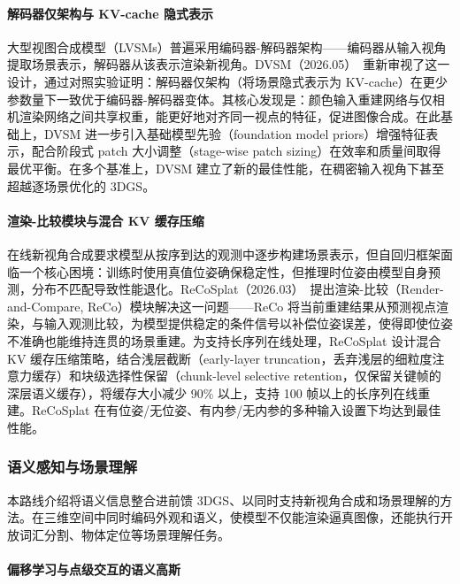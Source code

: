 \paragraph{解码器仅架构与 KV-cache 隐式表示}

大型视图合成模型（LVSMs）普遍采用编码器-解码器架构——编码器从输入视角提取场景表示，解码器从该表示渲染新视角。DVSM（2026.05）~\cite{2605_29891}重新审视了这一设计，通过对照实验证明：解码器仅架构（将场景隐式表示为 KV-cache）在更少参数量下一致优于编码器-解码器变体。其核心发现是：颜色输入重建网络与仅相机渲染网络之间共享权重，能更好地对齐同一视点的特征，促进图像合成。在此基础上，DVSM 进一步引入基础模型先验（foundation model priors）增强特征表示，配合阶段式 patch 大小调整（stage-wise patch sizing）在效率和质量间取得最优平衡。在多个基准上，DVSM 建立了新的最佳性能，在稠密输入视角下甚至超越逐场景优化的 3DGS。

\paragraph{渲染-比较模块与混合 KV 缓存压缩}

在线新视角合成要求模型从按序到达的观测中逐步构建场景表示，但自回归框架面临一个核心困境：训练时使用真值位姿确保稳定性，但推理时位姿由模型自身预测，分布不匹配导致性能退化。ReCoSplat（2026.03）~\cite{2603_09968}提出渲染-比较（Render-and-Compare, ReCo）模块解决这一问题——ReCo 将当前重建结果从预测视点渲染，与输入观测比较，为模型提供稳定的条件信号以补偿位姿误差，使得即使位姿不准确也能维持连贯的场景重建。为支持长序列在线处理，ReCoSplat 设计混合 KV 缓存压缩策略，结合浅层截断（early-layer truncation，丢弃浅层的细粒度注意力缓存）和块级选择性保留（chunk-level selective retention，仅保留关键帧的深层语义缓存），将缓存大小减少 90\% 以上，支持 100 帧以上的长序列在线重建。ReCoSplat 在有位姿/无位姿、有内参/无内参的多种输入设置下均达到最佳性能。

\subsubsection{语义感知与场景理解}

本路线介绍将语义信息整合进前馈 3DGS、以同时支持新视角合成和场景理解的方法。在三维空间中同时编码外观和语义，使模型不仅能渲染逼真图像，还能执行开放词汇分割、物体定位等场景理解任务。

\paragraph{偏移学习与点级交互的语义高斯}

